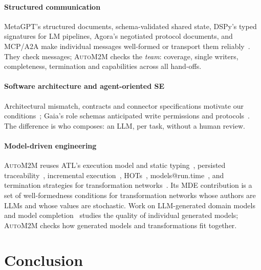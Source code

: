 \documentclass[10pt,a4paper]{article}
\newcommand{\auto}{\textsc{AutoM2M}}
\begin{document}
\paragraph{Structured communication} MetaGPT's structured documents,
schema-validated shared state, DSPy's typed signatures for LM pipelines,
Agora's negotiated protocol documents, and MCP/A2A make individual messages
well-formed or transport them
reliably~\cite{hong2024metagpt,zhang2026patchboard,khattab2024dspy,marro2024agora,mcp2024,a2a2025}.
They check messages; \auto{} checks the \emph{team}: coverage, single
writers, completeness, termination and capabilities across all hand-offs.

\paragraph{Software architecture and agent-oriented SE} Architectural
mismatch, contracts and connector specifications motivate our
conditions~\cite{garlan1995mismatch,garlan2009mismatch,meyer1992dbc,allen1997connection};
Gaia's role schemas anticipated write permissions and
protocols~\cite{wooldridge2000gaia}. The difference is who composes: an
LLM, per task, without a human review.

\paragraph{Model-driven engineering} \auto{} reuses ATL's execution model
and static typing~\cite{jouault2008atl}, persisted
traceability~\cite{jouault2005traceability,vara2014metagem}, incremental
execution~\cite{jouault2010incremental}, HOTs~\cite{tisi2009hot},
models@run.time~\cite{blair2009runtime}, and termination strategies for
transformation networks~\cite{stevens2020networks,klare2023termination}.
Its MDE contribution is a set of well-formedness conditions for
transformation networks whose authors are LLMs and whose values are
stochastic. Work on LLM-generated domain models and model
completion~\cite{chen2023domainmodeling,chaaben2023fewshot,clariso2023mdpe}
studies the quality of individual generated models; \auto{} checks how
generated models and transformations fit together.

\section{Conclusion}\label{sec:conclusion}
\end{document}
